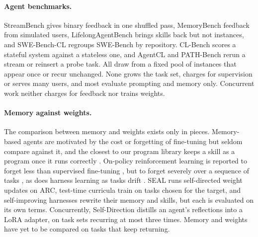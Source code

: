 \paragraph{Agent benchmarks.}
StreamBench \citep{wu2024streambench} gives binary feedback in one shuffled pass, MemoryBench \citep{ai2025memorybench} feedback from simulated users, LifelongAgentBench \citep{zheng2025lifelongagentbench} brings skills back but not instances, and SWE-Bench-CL \citep{joshi2025swebenchcl} regroups SWE-Bench by repository. CL-Bench \citep{asawa2026clbench} scores a stateful system against a stateless one, and AgentCL \citep{shu2026agentcl} and PATH-Bench \citep{yang2026pathbench} rerun a stream or reinsert a probe task. All draw from a fixed pool of instances that appear once or recur unchanged. None grows the task set, charges for supervision or serves many users, and most evaluate prompting and memory only. Concurrent work \citep{anonymous2026continualautoresearch,zheng2026servelearnbench,zhao2026cle} neither charges for feedback nor trains weights.

\paragraph{Memory against weights.}
The comparison between memory and weights exists only in pieces. Memory-based agents \citep{shinn2023reflexion,zhao2024expel,suzgun2025dynamiccheatsheet,zhou2025memento,nekoei2025jefhinter,zhang2026ace} are motivated by the cost or forgetting of fine-tuning but seldom compare against it, and the closest to our program library keeps a skill as a program once it runs correctly \citep{wang2025asi}. On-policy reinforcement learning is reported to forget less than supervised fine-tuning \citep{shenfeld2025rlsrazor,chen2026retaining}, but to forget severely over a sequence of tasks \citep{luo2026rlforgets}, as does harness learning as tasks drift \citep{chen2026selfevolving}. SEAL \citep{zweiger2025seal} runs self-directed weight updates on ARC, test-time curricula \citep{hubotter2025testtimecurricula} train on tasks chosen for the target, and self-improving harnesses \citep{karten2026primeagent} rewrite their memory and skills, but each is evaluated on its own terms. Concurrently, Self-Direction \citep{kansal2026selfdirection} distills an agent's reflections into a LoRA adapter, on task sets recurring at most three times. Memory and weights have yet to be compared on tasks that keep returning.
